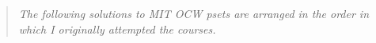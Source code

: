 \documentclass{article}
\begin{document}
%
\author{\textti\auth}%
\title{\textti\tight}%
\date{}%
\maketitle%
\tableofcontents%

% 
\begin{quotation}
  \textsl{The following solutions to MIT OCW psets are arranged in the
    order in which I originally attempted the courses.}
\end{quotation}











\end{document}
